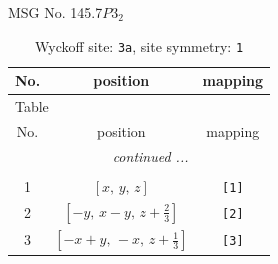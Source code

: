 \documentclass[fleqn,8pt]{jsarticle}
\begin{document}
\setcounter{MaxMatrixCols}{32}

\renewcommand{\tablename}{Table~}
\renewcommand{\figurename}{Figure~}
\begin{center}
\LARGE
MSG No. 145.7\quad$P3_{2}$
\end{center}
\renewcommand{\arraystretch}{1.2}
\begin{longtable}{ccc}
\caption{Wyckoff site: {\tt 3a}, site symmetry: {\tt 1}}
 \\
 \hline \hline
No. & position & mapping \\ \hline \endfirsthead

\multicolumn{2}{l}{\tablename\ \thetable{}} \\
 \hline \hline
No. & position & mapping \\ \hline \endhead

 \hline \hline
\multicolumn{2}{r}{\footnotesize\it continued ...} \\ \endfoot

 \hline \hline
\multicolumn{2}{r}{} \\ \endlastfoot

1 & $\left[ x,\, y,\, z \right]$ & {\tt [1]} \\ \hline
2 & $\left[ - y,\, x - y,\, z + \frac{2}{3} \right]$ & {\tt [2]} \\ \hline
3 & $\left[ - x + y,\, - x,\, z + \frac{1}{3} \right]$ & {\tt [3]} \\
\end{longtable}
\end{document}
